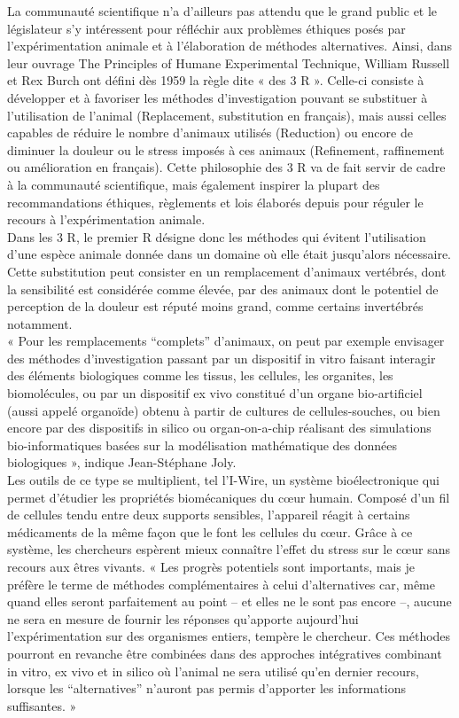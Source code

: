 \documentclass[10pt]{article}
\begin{document}
 La communauté scientifique n’a d’ailleurs pas attendu que le grand public et le législateur s’y intéressent pour réfléchir aux problèmes éthiques posés par l’expérimentation animale et à l’élaboration de méthodes alternatives. Ainsi, dans leur ouvrage The Principles of Humane Experimental Technique, William Russell et Rex Burch ont défini dès 1959 la règle dite « des 3 R ». Celle-ci consiste à développer et à favoriser les méthodes d’investigation pouvant se substituer à l’utilisation de l’animal (Replacement, substitution en français), mais aussi celles capables de réduire le nombre d’animaux utilisés (Reduction) ou encore de diminuer la douleur ou le stress imposés à ces animaux (Refinement, raffinement ou amélioration en français). Cette philosophie des 3 R va de fait servir de cadre à la communauté scientifique, mais également inspirer la plupart des recommandations éthiques, règlements et lois élaborés depuis pour réguler le recours à l’expérimentation animale.\\
 
 Dans les 3 R, le premier R désigne donc les méthodes qui évitent l’utilisation d’une espèce animale donnée dans un domaine où elle était jusqu’alors nécessaire. Cette substitution peut consister en un remplacement d’animaux vertébrés, dont la sensibilité est considérée comme élevée, par des animaux dont le potentiel de perception de la douleur est réputé moins grand, comme certains invertébrés notamment.\\
 
 « Pour les remplacements “complets” d’animaux, on peut par exemple envisager des méthodes d’investigation passant par un dispositif in vitro faisant interagir des éléments biologiques comme les tissus, les cellules, les organites, les biomolécules, ou par un dispositif ex vivo constitué d’un organe bio-artificiel (aussi appelé organoïde) obtenu à partir de cultures de cellules-souches, ou bien encore par des dispositifs in silico ou organ-on-a-chip réalisant des simulations bio-informatiques basées sur la modélisation mathématique des données biologiques », indique Jean-Stéphane Joly.\\
 
  Les outils de ce type se multiplient, tel l’I-Wire, un système bioélectronique qui permet d’étudier les propriétés biomécaniques du cœur humain. Composé d’un fil de cellules tendu entre deux supports sensibles, l’appareil réagit à certains médicaments de la même façon que le font les cellules du cœur. Grâce à ce système, les chercheurs espèrent mieux connaître l’effet du stress sur le cœur sans recours aux êtres vivants. « Les progrès potentiels sont importants, mais je préfère le terme de méthodes complémentaires à celui d’alternatives car, même quand elles seront parfaitement au point – et elles ne le sont pas encore –, aucune ne sera en mesure de fournir les réponses qu’apporte aujourd’hui l’expérimentation sur des organismes entiers, tempère le chercheur. Ces méthodes pourront en revanche être combinées dans des approches intégratives combinant in vitro, ex vivo et in silico où l’animal ne sera utilisé qu’en dernier recours, lorsque les “alternatives” n’auront pas permis d’apporter les informations suffisantes. »\\
 
\end{document}
